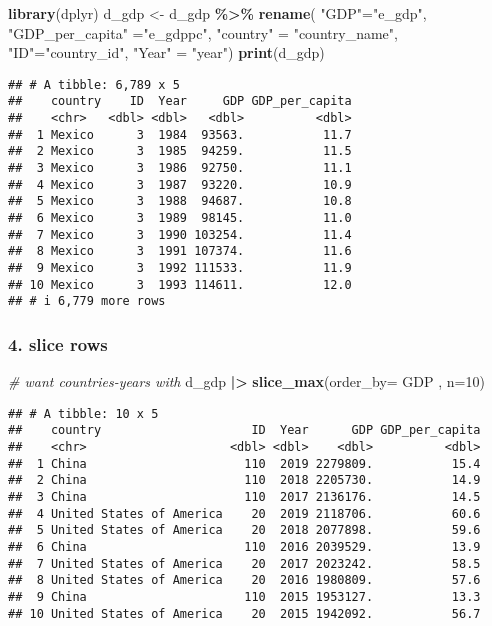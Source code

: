 \documentclass[
]{article}
\newenvironment{Shaded}{\begin{snugshade}}{\end{snugshade}}
\newcommand{\AttributeTok}[1]{\textcolor[rgb]{0.13,0.29,0.53}{#1}}
\newcommand{\CommentTok}[1]{\textcolor[rgb]{0.56,0.35,0.01}{\textit{#1}}}
\newcommand{\DecValTok}[1]{\textcolor[rgb]{0.00,0.00,0.81}{#1}}
\newcommand{\FunctionTok}[1]{\textcolor[rgb]{0.13,0.29,0.53}{\textbf{#1}}}
\newcommand{\NormalTok}[1]{#1}
\newcommand{\OtherTok}[1]{\textcolor[rgb]{0.56,0.35,0.01}{#1}}
\newcommand{\SpecialCharTok}[1]{\textcolor[rgb]{0.81,0.36,0.00}{\textbf{#1}}}
\newcommand{\StringTok}[1]{\textcolor[rgb]{0.31,0.60,0.02}{#1}}
\begin{document}
\begin{Shaded}
\begin{Highlighting}[]
\FunctionTok{library}\NormalTok{(dplyr)}
\NormalTok{d\_gdp }\OtherTok{\textless{}{-}}\NormalTok{ d\_gdp }\SpecialCharTok{\%\textgreater{}\%}
  \FunctionTok{rename}\NormalTok{( }\StringTok{"GDP"}\OtherTok{=}\StringTok{"e\_gdp"}\NormalTok{, }\StringTok{"GDP\_per\_capita"} \OtherTok{=}\StringTok{"e\_gdppc"}\NormalTok{, }\StringTok{"country"} \OtherTok{=} \StringTok{"country\_name"}\NormalTok{, }\StringTok{"ID"}\OtherTok{=}\StringTok{"country\_id"}\NormalTok{, }\StringTok{"Year"} \OtherTok{=} \StringTok{"year"}\NormalTok{)}
\FunctionTok{print}\NormalTok{(d\_gdp)}
\end{Highlighting}
\end{Shaded}

\begin{verbatim}
## # A tibble: 6,789 x 5
##    country    ID  Year     GDP GDP_per_capita
##    <chr>   <dbl> <dbl>   <dbl>          <dbl>
##  1 Mexico      3  1984  93563.           11.7
##  2 Mexico      3  1985  94259.           11.5
##  3 Mexico      3  1986  92750.           11.1
##  4 Mexico      3  1987  93220.           10.9
##  5 Mexico      3  1988  94687.           10.8
##  6 Mexico      3  1989  98145.           11.0
##  7 Mexico      3  1990 103254.           11.4
##  8 Mexico      3  1991 107374.           11.6
##  9 Mexico      3  1992 111533.           11.9
## 10 Mexico      3  1993 114611.           12.0
## # i 6,779 more rows
\end{verbatim}

\hypertarget{slice-rows}{%
\subsubsection{4. slice rows}\label{slice-rows}}

\begin{Shaded}
\begin{Highlighting}[]
\CommentTok{\# want countries{-}years with }
\NormalTok{d\_gdp }\SpecialCharTok{|\textgreater{}}
  \FunctionTok{slice\_max}\NormalTok{(}\AttributeTok{order\_by=}\NormalTok{ GDP , }\AttributeTok{n=}\DecValTok{10}\NormalTok{)}
\end{Highlighting}
\end{Shaded}

\begin{verbatim}
## # A tibble: 10 x 5
##    country                     ID  Year      GDP GDP_per_capita
##    <chr>                    <dbl> <dbl>    <dbl>          <dbl>
##  1 China                      110  2019 2279809.           15.4
##  2 China                      110  2018 2205730.           14.9
##  3 China                      110  2017 2136176.           14.5
##  4 United States of America    20  2019 2118706.           60.6
##  5 United States of America    20  2018 2077898.           59.6
##  6 China                      110  2016 2039529.           13.9
##  7 United States of America    20  2017 2023242.           58.5
##  8 United States of America    20  2016 1980809.           57.6
##  9 China                      110  2015 1953127.           13.3
## 10 United States of America    20  2015 1942092.           56.7
\end{verbatim}
\end{document}
